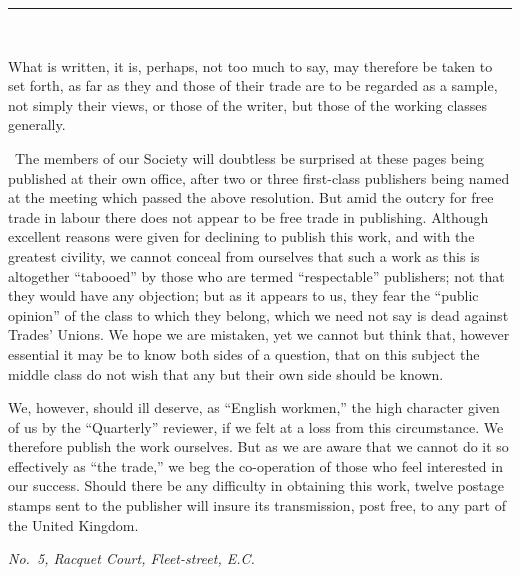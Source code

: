 \begin{center}
\rule{10cm}{0.4pt}\\
\end{center}

What is written, it is, perhaps, not too much to say, may therefore be taken
to set forth, as far as they and those of their trade are to be regarded as a
sample, not simply their views, or those of the writer, but those of the
working classes generally.

~The members of our Society will doubtless be surprised at these pages being
published at their own office, after two or three first-class publishers being
named at the meeting which passed the above resolution. But amid the outcry for
free trade in labour there does not appear to be free trade in publishing.
Although excellent reasons were given for declining to publish this work, and
with the greatest civility, we cannot conceal from ourselves that such a work
as this is altogether ``tabooed'' by those who are termed ``respectable''
publishers; not that they would have any objection; but as it appears to us,
they fear the ``public opinion'' of the class to which they belong, which we
need not say is dead against Trades' Unions. We hope we are mistaken, yet we
cannot but think that, however essential it may be to know both sides of a
question, that on this subject the middle class do not wish that any but their
own side should be known.

We, however, should ill deserve, as ``English workmen,'' the high character
given of us by the ``Quarterly'' reviewer, if we felt at a loss from this
circumstance. We therefore publish the work ourselves. But as we are aware
that we cannot do it so effectively as ``the trade,'' we beg the co-operation
of those who feel interested in our success. Should there be any difficulty in
obtaining this work, twelve postage stamps sent to the publisher will insure
its transmission, post free, to any part of the United Kingdom.

\begin{flushleft}
\textit{No.\ 5, Racquet Court, Fleet-street, E.C.}
\end{flushleft}
